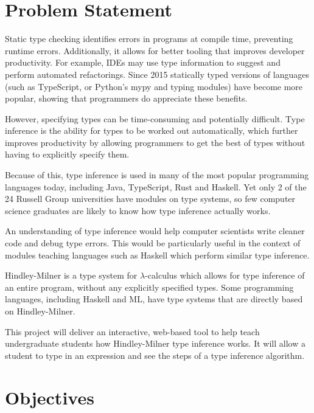 \documentclass[12pt]{article}
\begin{document}
\maketitle

\section{Problem Statement}

Static type checking identifies errors in programs at compile time, preventing runtime errors. Additionally, it allows for better tooling that improves developer productivity. For example, IDEs may use type information to suggest and perform automated refactorings.\cite{ref1}\cite{ref2} Since 2015 statically typed versions of languages (such as TypeScript, or Python’s mypy and typing modules\cite{ref3}) have become more popular, showing that programmers do appreciate these benefits.

However, specifying types can be time-consuming and potentially difficult. Type inference is the ability for types to be worked out automatically, which further improves productivity by allowing programmers to get the best of types without having to explicitly specify them.

Because of this, type inference is used in many of the most popular programming languages today, including Java, TypeScript, Rust and Haskell. Yet only 2 of the 24 Russell Group universities have modules on type systems, so few computer science graduates are likely to know how type inference actually works.

An understanding of type inference would help computer scientists write cleaner code and debug type errors. This would be particularly useful in the context of modules teaching languages such as Haskell which perform similar type inference.

Hindley-Milner is a type system for $\lambda$-calculus which allows for type inference of an entire program, without any explicitly specified types. Some programming languages, including Haskell and ML, have type systems that are directly based on Hindley-Milner.

This project will deliver an interactive, web-based tool to help teach undergraduate students how Hindley-Milner type inference works. It will allow a student to type in an expression and see the steps of a type inference algorithm.

\section{Objectives}
\end{document}
